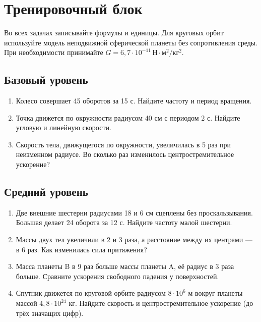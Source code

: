 \documentclass[a4paper,12pt]{article}
\newcommand{\unit}[1]{\,\text{#1}}
\begin{document}
\section*{Тренировочный блок}
Во всех задачах записывайте формулы и единицы. Для круговых орбит используйте модель неподвижной сферической планеты без сопротивления среды. При необходимости принимайте $G=6{,}7\cdot10^{-11}\unit{Н}\cdot\text{м}^2/\text{кг}^2$.
\subsection*{Базовый уровень}
\begin{enumerate}[itemsep=8pt]
\item Колесо совершает 45 оборотов за 15 с. Найдите частоту и период вращения.
\item Точка движется по окружности радиусом 40 см с периодом 2 с. Найдите угловую и линейную скорости.
\item Скорость тела, движущегося по окружности, увеличилась в 5 раз при неизменном радиусе. Во сколько раз изменилось центростремительное ускорение?
\end{enumerate}
\subsection*{Средний уровень}
\begin{enumerate}[resume,itemsep=8pt]
\item Две внешние шестерни радиусами 18 и 6 см сцеплены без проскальзывания. Большая делает 24 оборота за 12 с. Найдите частоту малой шестерни.
\item Массы двух тел увеличили в 2 и 3 раза, а расстояние между их центрами --- в 6 раз. Как изменилась сила притяжения?
\item Масса планеты B в 9 раз больше массы планеты A, её радиус в 3 раза больше. Сравните ускорения свободного падения у поверхностей.
\item Спутник движется по круговой орбите радиусом $8\cdot10^6$ м вокруг планеты массой $4{,}8\cdot10^{24}$ кг. Найдите скорость и центростремительное ускорение (до трёх значащих цифр).
\end{enumerate}
\clearpage
\end{document}
